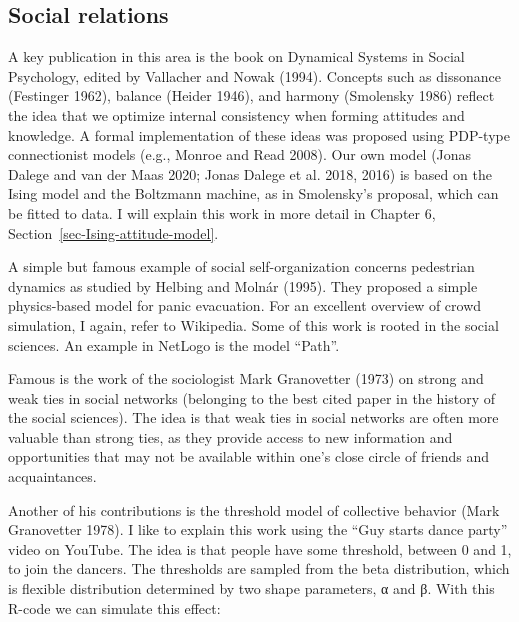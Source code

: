 \documentclass[
  a4paper,
  DIV=11,
  numbers=noendperiod,
  oneside]{scrreprt}
\begin{document}
\hypertarget{sec-Social-relations}{%
\subsection{Social relations}\label{sec-Social-relations}}

A key publication in this area is the book on Dynamical Systems in
Social Psychology, edited by Vallacher and Nowak (1994). Concepts such
as dissonance (Festinger 1962), balance (Heider 1946), and harmony
(Smolensky 1986) reflect the idea that we optimize internal consistency
when forming attitudes and knowledge. A formal implementation of these
ideas was proposed using PDP-type connectionist models (e.g., Monroe and
Read 2008). Our own model (Jonas Dalege and van der Maas 2020; Jonas
Dalege et al. 2018, 2016) is based on the Ising model and the Boltzmann
machine, as in Smolensky's proposal, which can be fitted to data. I will
explain this work in more detail in Chapter 6,
Section~\ref{sec-Ising-attitude-model}.

A simple but famous example of social self-organization concerns
pedestrian dynamics as studied by Helbing and Molnár (1995). They
proposed a simple physics-based model for panic evacuation. For an
excellent overview of crowd simulation, I again, refer to Wikipedia.
Some of this work is rooted in the social sciences. An example in
NetLogo is the model ``Path''.

Famous is the work of the sociologist Mark Granovetter (1973) on strong
and weak ties in social networks (belonging to the best cited paper in
the history of the social sciences). The idea is that weak ties in
social networks are often more valuable than strong ties, as they
provide access to new information and opportunities that may not be
available within one's close circle of friends and acquaintances.

Another of his contributions is the threshold model of collective
behavior (Mark Granovetter 1978). I like to explain this work using the
``Guy starts dance party'' video on YouTube. The idea is that people
have some threshold, between 0 and 1, to join the dancers. The
thresholds are sampled from the beta distribution, which is flexible
distribution determined by two shape parameters, α and β. With this
R-code we can simulate this effect:
\end{document}
